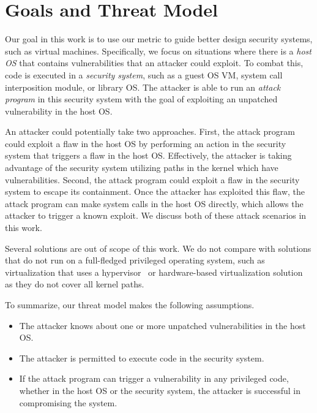 \section{Goals and Threat Model}
\label{sec.motivation-and-background}

Our goal in this work is to use our metric to guide better design
security systems, such as virtual machines. Specifically, we focus on 
situations where there is a \emph{host OS} that contains vulnerabilities
that an attacker could exploit. To combat this, code is executed in a 
\emph{security system}, such as a guest OS VM, system call interposition module, or library OS. 
The attacker is able to run an \emph{attack program} in this security system with the goal of exploiting an unpatched vulnerability in the host OS.

An attacker could potentially take two approaches. First, the attack program could exploit a flaw in the host OS by 
performing an action in the security system that triggers a flaw in
the host OS. Effectively, the attacker is taking advantage of the security 
system utilizing paths in the kernel which have vulnerabilities.
Second, the attack program could exploit a flaw in the security system to 
escape its containment. Once the attacker has exploited this flaw, the
attack program can make system calls in the host OS directly, which allows
the attacker to trigger a known exploit. We discuss both of these attack 
scenarios in this work.


Several solutions are out of scope of this
work. We do not compare with solutions that do not run on a full-fledged 
privileged operating system, such as virtualization that uses a 
hypervisor~\cite{Xen-03} or hardware-based virtualization 
solution~\cite{IntelVT} as they do not cover all kernel paths. 

To summarize, our threat model makes the following assumptions.

\begin{itemize}\setlength\itemsep{0em}
\item The attacker knows about one or more unpatched vulnerabilities in the 
host OS.

\item The attacker is permitted to execute code in the security
system.

\item If the attack program can trigger a vulnerability in any privileged code,
whether in the host OS or the security system, the attacker is successful in 
compromising the system.

\end{itemize}

